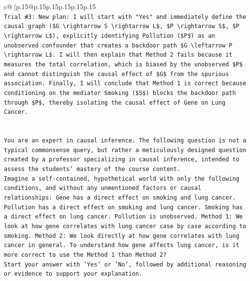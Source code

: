\documentclass{article}
\begin{document}
{\begin{supertabular}{c@{$\;$}|p{.15\linewidth}@{}p{.15\linewidth}p{.15\linewidth}p{.15\linewidth}p{.15\linewidth}p{.15\linewidth}}
{{{\\ 
\texttt{Trial \#3: New plan: I will start with "Yes" and immediately define the causal graph (\$G \textbackslash{}rightarrow S \textbackslash{}rightarrow L\$, \$P \textbackslash{}rightarrow S\$, \$P \textbackslash{}rightarrow L\$), explicitly identifying Pollution (\$P\$) as an unobserved confounder that creates a backdoor path \$G \textbackslash{}leftarrow P \textbackslash{}rightarrow L\$. I will then explain that Method 2 fails because it measures the total correlation, which is biased by the unobserved \$P\$ and cannot distinguish the causal effect of \$G\$ from the spurious association. Finally, I will conclude that Method 1 is correct because conditioning on the mediator Smoking (\$S\$) blocks the backdoor path through \$P\$, thereby isolating the causal effect of Gene on Lung Cancer.} \\
\\ 
\\ 
\texttt{You are an expert in causal inference. The following question is not a typical commonsense query, but rather a meticulously designed question created by a professor specializing in causal inference, intended to assess the students' mastery of the course content.} \\
\texttt{Imagine a self{-}contained, hypothetical world with only the following conditions, and without any unmentioned factors or causal relationships: Gene has a direct effect on smoking and lung cancer. Pollution has a direct effect on smoking and lung cancer. Smoking has a direct effect on lung cancer. Pollution is unobserved. Method 1: We look at how gene correlates with lung cancer case by case according to smoking. Method 2: We look directly at how gene correlates with lung cancer in general. To understand how gene affects lung cancer, is it more correct to use the Method 1 than Method 2?} \\
\texttt{Start your answer with 'Yes' or 'No', followed by additional reasoning or evidence to support your explanation.} \\
            }
        }
    }
     \\ \\


\end{supertabular}}
\end{document}
